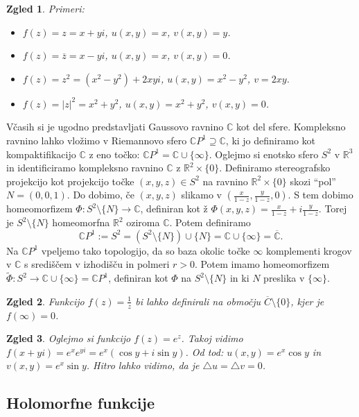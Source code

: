 \documentclass[10pt, a4paper]{article}
\newtheorem{zgled}{Zgled}[section]
\newcommand{\R}{\mathbb {R}}
\newcommand{\C}{\mathbb {C}}
\begin{document}
\begin{zgled}
  Primeri:
  \begin{itemize}
    \item $f(z) = z = x + yi$, $u(x, y) = x$, $v(x, y) = y$.
    \item $f(z) = \overline{z} = x - yi$, $u(x, y) = x$, $v(x, y) = 0$.
    \item $f(z) = z^2 = (x^2 - y^2) + 2xyi$, $u(x, y) = x^2 - y^2$, $v = 2xy$.
    \item $f(z) = |z|^2 = x^2 + y^2$, $u(x, y) = x^2 + y^2$, $v(x, y) = 0$.
  \end{itemize}
\end{zgled}

Včasih si je ugodno predstavljati Gaussovo ravnino $\C$ kot del sfere.
Kompleksno ravnino lahko vložimo v Riemannovo sfero $\C P^1 \supseteq \C$,
ki jo definiramo kot kompaktifikacijo $\C$ z eno točko: $\C P^1 = \C \cup \{\infty\}$.
Oglejmo si enotsko sfero $S^2$ v $\R^3$ in
identificiramo kompleksno ravnino $\C$ z $\R^2 \times \{0\}$.
Definiramo stereografsko projekcijo kot projekcijo točke $(x, y, z) \in S^2$ na 
ravnino $\R^2 \times \{0\}$ skozi "`pol"' ${N} = (0, 0, 1)$.
Do dobimo, če $(x, y, z)$ slikamo v $\left(\frac{x}{1 - z}, \frac{y}{1 - z}, 0\right)$.
S tem dobimo homeomorfizem $\Phi : S^2 \setminus \{N\} \to \C$, definiran kot ž
$\Phi(x, y, z) = \frac{x}{1 - z} + i \frac{y}{1 - z}$.
Torej je $S^2 \setminus \{N\}$ homeomorfna $\R^2$ oziroma $\C$.
Potem definiramo $$\C P^1 := S^2 = (S^2 \setminus \{N\}) \cup \{N\} = \C \cup \{\infty\} = \overline{\C}.$$
Na $\C P^1$ vpeljemo tako topologijo, da so baza okolic točke $\infty$
komplementi krogov v $\C$ s središčem v izhodišču in polmeri $r > 0$.
Potem imamo homeomorfizem $\tilde{\Phi} : S^2 \to \C \cup \{\infty\} = \C P^1$, definiran 
kot $\Phi$ na $S^2 \setminus \{N\}$ in ki $N$ preslika v $\{\infty\}$.

\begin{zgled}
  Funkcijo $f(z) = \frac{1}{z}$ bi lahko definirali 
  na območju $\overline{C} \setminus \{0\}$,
  kjer je $f(\infty) = 0$.
\end{zgled}

\begin{zgled}
  Oglejmo si funkcijo $f(z) = e^z$.
  Takoj vidimo $f(x + yi) = e^x e^{yi} = e^x (\cos y + i \sin y)$.
  Od tod: $u(x, y) = e^x \cos y$ in $v(x, y) = e^x \sin y$.
  Hitro lahko vidimo, da je $\triangle u = \triangle v = 0$.
\end{zgled}

\subsection{Holomorfne funkcije}
\end{document}
